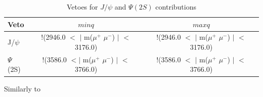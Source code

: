 \begin{table}[h!]
\begin{center}
\begin{tabular}{l c c}
	Veto & $minq$ \mevcc & $maxq$ \mevcc \\ \hline
        J/$\psi$  & !(2946.0 $<$ $|$ m($\mu^{+}$ $\mu^{-}$) $|$ $<$ 3176.0) & !(2946.0 $<$ $|$ m($\mu^{+}$ $\mu^{-}$) $|$ $<$ 3176.0) \\
	$\Psi$(2S) &  !(3586.0 $<|$ m($\mu^{+}$ $\mu^{-}$) $|$ $<$ 3766.0) & !(3586.0 $<$ $|$ m($\mu^{+}$ $\mu^{-}$) $|$ $<$ 3766.0) \\
        \hline
\end{tabular}
\end{center}
\caption{Vetoes for $J/\psi$ and $\Psi(2S)$ contributions}
\label{tab:vetoes}
\end{table}


Similarly to


